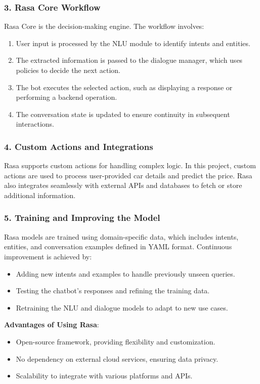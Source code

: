 \documentclass[a4paper,12pt]{article}
\begin{document}
\subsubsection{3. Rasa Core Workflow}
Rasa Core is the decision-making engine. The workflow involves:
\begin{enumerate}
	\item User input is processed by the NLU module to identify intents and entities.
	\item The extracted information is passed to the dialogue manager, which uses policies to decide the next action.
	\item The bot executes the selected action, such as displaying a response or performing a backend operation.
	\item The conversation state is updated to ensure continuity in subsequent interactions.
\end{enumerate}

\subsubsection{4. Custom Actions and Integrations}
Rasa supports custom actions for handling complex logic. In this project, custom actions are used to process user-provided car details and predict the price. Rasa also integrates seamlessly with external APIs and databases to fetch or store additional information.

\subsubsection{5. Training and Improving the Model}
Rasa models are trained using domain-specific data, which includes intents, entities, and conversation examples defined in YAML format. Continuous improvement is achieved by:
\begin{itemize}
	\item Adding new intents and examples to handle previously unseen queries.
	\item Testing the chatbot’s responses and refining the training data.
	\item Retraining the NLU and dialogue models to adapt to new use cases.
\end{itemize}

\textbf{Advantages of Using Rasa}:
\begin{itemize}
	\item Open-source framework, providing flexibility and customization.
	\item No dependency on external cloud services, ensuring data privacy.
	\item Scalability to integrate with various platforms and APIs.
\end{itemize}
\end{document}
